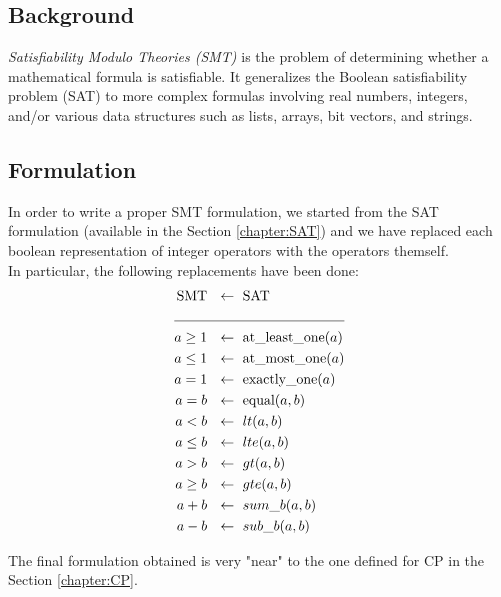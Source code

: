 
\subsection{Background}
    \textit{Satisfiability Modulo Theories (SMT)} is the problem of determining whether a
    mathematical formula is satisfiable. It generalizes the Boolean satisfiability problem (SAT) to
    more complex formulas involving real numbers, integers, and/or various data structures such as 
    lists, arrays, bit vectors, and strings.


\subsection{Formulation}
    In order to write a proper SMT formulation, we started from the SAT formulation (available in
    the Section \ref{chapter:SAT}) and we have replaced each boolean representation of integer 
    operators with the operators themself.\\

    In particular, the following replacements have been done:
    \begin{align*}
      \text{SMT} \ &\ \leftarrow\ \text{SAT}      \\
                 \cline{1-2}
        a \geq 1 \ &\ \leftarrow\ \text{at\_least\_one}(a) \\
        a \leq 1 \ &\ \leftarrow\ \text{at\_most\_one}(a)  \\
           a = 1 \ &\ \leftarrow\ \text{exactly\_one}(a)   \\
           a = b \ &\ \leftarrow\ \text{equal}(a,b)        \\
           a < b \ &\ \leftarrow\ lt(a,b)                  \\
        a \leq b \ &\ \leftarrow\ lte(a,b)                 \\
           a > b \ &\ \leftarrow\ gt(a,b)                  \\
        a \geq b \ &\ \leftarrow\ gte(a,b)                 \\
           a + b \ &\ \leftarrow\ sum\_b(a,b)              \\   
           a - b \ &\ \leftarrow\ sub\_b(a,b)                 
    \end{align*}

    The final formulation obtained is very "near" to the one defined for CP in the
    Section \ref{chapter:CP}.

